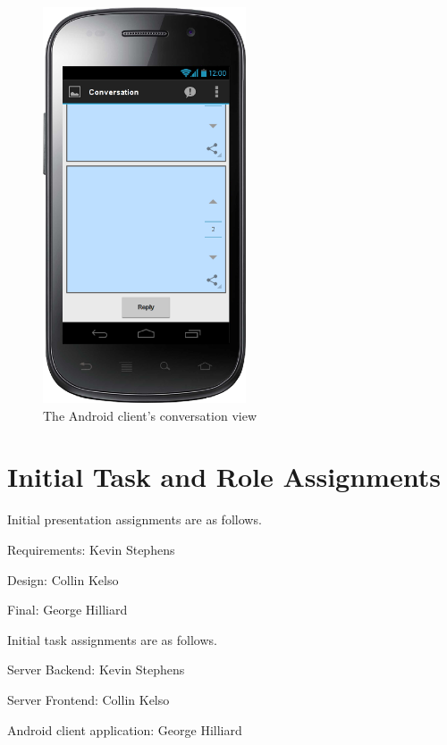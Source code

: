 \documentclass[11pt]{scrartcl}
\let\stdsection\section
\renewcommand\section{\newpage\stdsection}
\begin{document}
        \begin{figure}[h]
            \centering \includegraphics[width=6cm,keepaspectratio]{mockups/conversation-view}
            \caption{The Android client's conversation view}
            \label{fig:conversationscreen}
        \end{figure}

\section{Initial Task and Role Assignments}
    Initial presentation assignments are as follows.

    \begin{description*}
        \item[Requirements:] Kevin Stephens
        \item[Design:] Collin Kelso
        \item[Final:] George Hilliard
    \end{description*}

    \noindent
    Initial task assignments are as follows.

    \begin{description*}
        \item[Server Backend:] Kevin Stephens
        \item[Server Frontend:] Collin Kelso
        \item[Android client application:] George Hilliard
    \end{description*}
\end{document}
